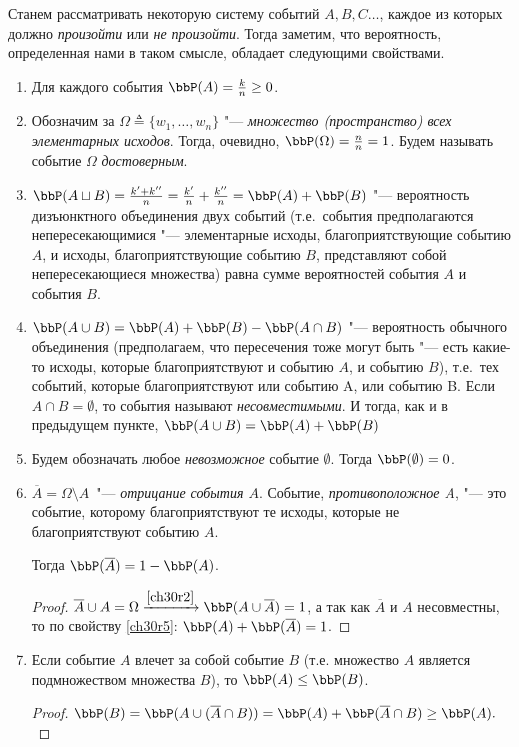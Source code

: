 Станем рассматривать некоторую систему событий $A,B,C\dots $, каждое из которых должно \textit{произойти} или \textit{не произойти}. Тогда заметим, что вероятность, определенная нами в таком смысле, обладает следующими свойствами.
\begin{enumerate}
\item 
Для каждого события $\bbP(A)=\frac{k}{n}\ge 0$.
\item \label{ch30r2}
Обозначим за $\Omega \triangleq \{w_1, \dots,w_n\}$ "--- \textit{множество (пространство) всех элементарных исходов}. Тогда, очевидно, $\bbP(\Omega)=\frac{n}{n}=1$. Будем называть событие $\Omega$ \textit{достоверным}. 

\item 
$\bbP(A\sqcup B)=\frac{k'+k''}{n}=\frac{k'}{n}+\frac{k''}{n}=\bbP(A)+\bbP(B)$ "--- вероятность дизъюнктного объединения двух событий (т.е.~события предполагаются непересекающимися "--- элементарные исходы, благоприятствующие событию $A$, и исходы, благоприятствующие событию $B$, представляют собой непересекающиеся множества) равна сумме вероятностей события $A$ и события $B$.
\item \label{ch30r5}
$\bbP(A\cup B)=\bbP(A)+\bbP(B)-\bbP(A\cap B)$ "--- вероятность обычного объединения (предполагаем, что пересечения тоже могут быть "--- есть какие-то исходы, которые благоприятствуют и событию $A$, и событию $B$), т.е.~тех событий, которые благоприятствуют или событию A, или событию B. Если $A\cap B=\emptyset$, то события называют \textit{несовместимыми}. И тогда, как и в предыдущем пункте, $\bbP(A\cup B)=\bbP(A)+\bbP(B)$
\item
Будем обозначать любое \textit{невозможное} событие $\emptyset$. Тогда $\bbP(\emptyset)=0$. 

\item
$\overline{A}=\Omega\setminus A$~"--- \textit{отрицание события $A$}. Событие, \textit{противоположное A}, "--- это событие, которому благоприятствуют те исходы, которые не благоприятствуют событию $A$. 

Тогда $\bbP(\overline{A})=1-\bbP(A)$.
\begin{proof}
$\overline{A}\cup A=\Omega\xrightarrow{\ref{ch30r2}}\bbP(A\cup\overline{A}) = 1$, а так как $\overline{A}$ и $A$ несовместны, то по свойству \ref{ch30r5}:  $\bbP(A)+\bbP(\overline{A}) = 1$.
\end{proof}

\item
Если событие $A$ влечет за собой событие $B$ (т.е. множество $A$ является подмножеством множества $B$), то $\bbP(A)\le \bbP(B)$.
\begin{proof}
$\bbP(B)=\bbP(A\cup (\overline{A}\cap B))=\bbP(A)+\bbP(\overline{A}\cap B)\ge \bbP(A).$
\end{proof}


\end{enumerate}
